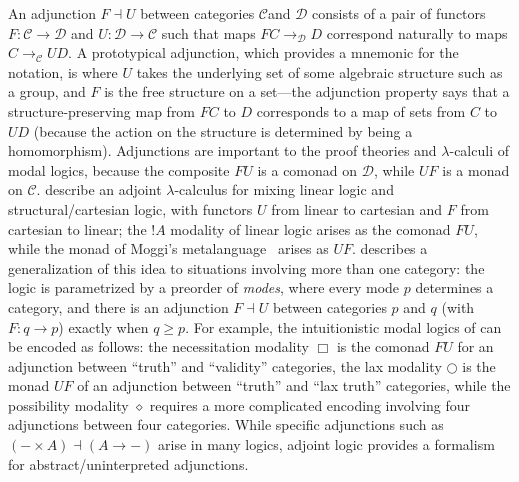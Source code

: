 \documentclass{drl-common/llncs}
\newcommand{\C}{\ensuremath{\mathcal{C}}}
\newcommand{\D}{\ensuremath{\mathcal{D}}}
\newcommand{\la}{\ensuremath{\dashv}}
\newcommand{\arrow}[3]{\ensuremath{#2 \longrightarrow_{#1} #3}}
\begin{document}
An adjunction $F \la U$ between categories \C and \D\/ consists of a
pair of functors $F : \C \to \D$ and $U : \D \to \C$ such that maps
\arrow{\D}{F C}{D} correspond naturally to maps \arrow{\C}{C}{U D}.  A
prototypical adjunction, which provides a mnemonic for the notation, is
where $U$ takes the underlying set of some algebraic structure such as a
group, and $F$ is the free structure on a set---the adjunction property
says that a structure-preserving map from $F C$ to $D$ corresponds to a
map of sets from $C$ to $U D$ (because the action on the structure is
determined by being a homomorphism).  Adjunctions are important to the
proof theories and $\lambda$-calculi of modal logics, because the
composite $FU$ is a comonad on \D, while $UF$ is a monad on $\C$.
\citet{benton94mixed,bentonwadler96adjoint} describe an adjoint
$\lambda$-calculus for mixing linear logic and structural/cartesian
logic, with functors $U$ from linear to cartesian and $F$ from cartesian
to linear; the $! A$ modality of linear logic arises as the comonad
$FU$, while the monad of Moggi's metalanguage~\citep{moggi91monad}
arises as $UF$.  \citet{reed09adjoint} describes a generalization of
this idea to situations involving more than one category: the logic is
parametrized by a preorder of \emph{modes}, where every mode $p$
determines a category, and there is an adjunction $F \la U$ between
categories $p$ and $q$ (with $F : q \to p$) exactly when $q \ge p$.  For
example, the intuitionistic modal logics of \citet{pfenningdavies} can
be encoded as follows: the necessitation modality $\Box$ is the comonad
$FU$ for an adjunction between ``truth'' and ``validity'' categories,
the lax modality $\bigcirc$ is the monad $UF$ of an adjunction between
``truth'' and ``lax truth'' categories, while the possibility modality
$\diamond$ requires a more complicated encoding involving four
adjunctions between four categories.  While specific adjunctions such as
$(- \times A) \la (A \to -)$ arise in many logics, adjoint logic
provides a formalism for abstract/uninterpreted adjunctions.
\end{document}
